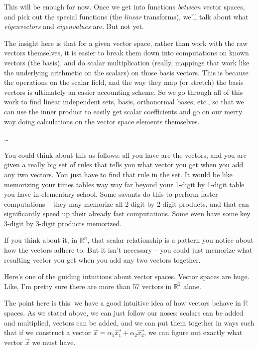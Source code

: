 \documentclass[
]{book}
\begin{document}
This will be enough for now. Once we get into functions \emph{between} vector spaces, and pick out the special functions (the \emph{linear} transforms), we'll talk about what \emph{eigenvectors} and \emph{eigenvalues} are. But not yet.

The insight here is that for a given vector space, rather than work with the raw vectors themselves, it is easier to break them down into computations on known vectors (the basis), and do scalar multiplication (really, mappings that work like the underlying arithmetic on the scalars) on those basis vectors. This is because the operations on the scalar field, and the way they map (or stretch) the basis vectors is ultimately an easier accounting scheme. So we go through all of this work to find linear independent sets, basis, orthonormal bases, etc., so that we can use the inner product to easily get scalar coefficients and go on our merry way doing calculations on the vector space elements themselves.

\ldots{}

You could think about this as follows: all you have are the vectors, and you are given a really big set of rules that tells you what vector you get when you add any two vectors. You just have to find that rule in the set. It would be like memorizing your times tables way way far beyond your 1-digit by 1-digit table you have in elementary school. Some savants do this to perform faster computations -- they may memorize all 2-digit by 2-digit products, and that can significantly speed up their already fast computations. Some even have some key 3-digit by 3-digit products memorized.

If you think about it, in \(\mathbb{R}^n\), that scalar relationship is a pattern you notice about how the vectors adhere to. But it isn't necessary -- you could just memorize what resulting vector you get when you add any two vectors together.

Here's one of the guiding intuitions about vector spaces. Vector spaces are huge. Like, I'm pretty sure there are more than 57 vectors in \(\mathbb{R}^2\) alone.

The point here is this: we have a good intuitive idea of how vectors behave in \(\mathbb{R}\) spaces. As we stated above, we can just follow our noses: scalars can be added and multiplied, vectors can be added, and we can put them together in ways such that if we construct a vector \(\vec{x} = \alpha_{1} \vec{x_{1}} + \alpha_{2} \vec{x_{2}}\), we can figure out exactly what vector \(\vec{x}\) we must have.
\end{document}
